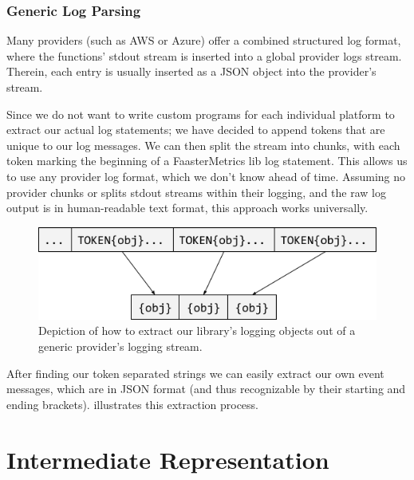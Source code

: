 \documentclass[../main.tex]{subfiles}
\begin{document}
\subsubsection{Generic Log Parsing}%
\label{ssub:analysisGenericParsing}

Many providers (such as AWS or Azure) offer a combined structured log format, 
where the functions' stdout stream is inserted into a global provider logs stream. 
Therein, each entry is usually inserted as a JSON object into the provider's stream. 

Since we do not want to write custom programs for each individual platform to extract our actual log statements; 
we have decided to append tokens that are unique to our log messages. 
We can then split the stream into chunks, with each token marking the beginning of a FaasterMetrics lib log statement.
This allows us to use any provider log format, which we don't know ahead of time. 
Assuming no provider chunks or splits stdout streams within their logging, 
and the raw log output is in human-readable text format, 
this approach works universally. 

\begin{figure}
\begin{center}
  \includegraphics[width=\linewidth, keepaspectratio]{./token-string.png}
\end{center}
\caption[Parsing Log Strings With Tokens]{%
  Depiction of how to extract our library's logging objects out of a generic provider's logging stream.
}%
\label{fig:analysisTokenStrings}
\end{figure}

After finding our token separated strings we can easily extract our own event messages, which are in JSON format
(and thus recognizable by their starting and ending brackets).
 illustrates this extraction process.

\section{Intermediate Representation}%
\label{sec:analysisIR}
\end{document}

